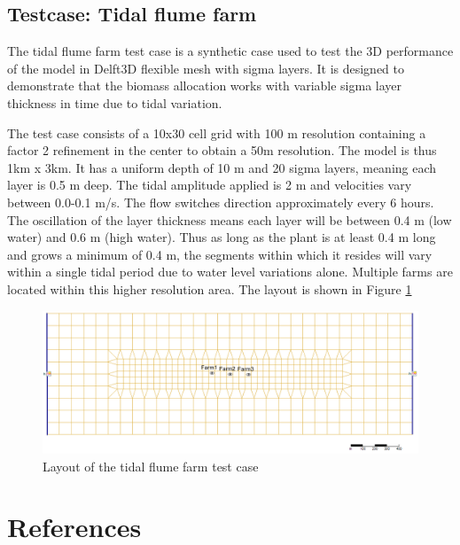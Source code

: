 \documentclass{deltares_manual}
\begin{document}
\subsection{Testcase: Tidal flume farm}
The tidal flume farm test case is a synthetic case used to test the 3D performance of the model in Delft3D flexible mesh with sigma layers. It is designed to demonstrate that the biomass allocation works with variable sigma layer thickness in time due to tidal variation.

The test case consists of a 10x30 cell grid with 100 m resolution containing a factor 2 refinement  in the center to obtain a 50m resolution. The model is thus 1km x 3km. It has a uniform depth of 10 m and 20 sigma layers, meaning each layer is 0.5 m deep. The tidal amplitude applied is 2 m and velocities vary between 0.0-0.1 m/s. The flow switches direction approximately every 6 hours. The oscillation of the layer thickness means each layer will be between 0.4 m (low water) and 0.6 m (high water). Thus as long as the plant is at least 0.4 m long and grows a minimum of 0.4 m, the segments within which it resides will vary within a single tidal period due to water level variations alone. Multiple farms are located within this higher resolution area. The layout is shown in Figure \ref{fig:tidalflumefarm}

\begin{figure}[H]
	\centering
	\includegraphics[width=1\linewidth]{figures/tidal_flume_farm}
	\caption{Layout of the tidal flume farm test case}
	\label{fig:tidalflumefarm}
\end{figure}


\section{References}

\end{document}
